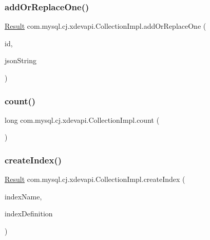 \subsubsection{\texorpdfstring{add\+Or\+Replace\+One()}{addOrReplaceOne()}\hspace{0.1cm}{\footnotesize\ttfamily [2/2]}}
{\footnotesize\ttfamily \mbox{\hyperlink{interfacecom_1_1mysql_1_1cj_1_1xdevapi_1_1_result}{Result}} com.\+mysql.\+cj.\+xdevapi.\+Collection\+Impl.\+add\+Or\+Replace\+One (\begin{DoxyParamCaption}\item[{String}]{id,  }\item[{String}]{json\+String }\end{DoxyParamCaption})}

\mbox{\label{classcom_1_1mysql_1_1cj_1_1xdevapi_1_1_collection_impl_ac5d114d9962c30fe704586addce32f07}} 
\subsubsection{\texorpdfstring{count()}{count()}}
{\footnotesize\ttfamily long com.\+mysql.\+cj.\+xdevapi.\+Collection\+Impl.\+count (\begin{DoxyParamCaption}{ }\end{DoxyParamCaption})}

\mbox{\label{classcom_1_1mysql_1_1cj_1_1xdevapi_1_1_collection_impl_ab56617c315aeee63c89d1b0d6a498b8c}} 
\subsubsection{\texorpdfstring{create\+Index()}{createIndex()}\hspace{0.1cm}{\footnotesize\ttfamily [1/2]}}
{\footnotesize\ttfamily \mbox{\hyperlink{interfacecom_1_1mysql_1_1cj_1_1xdevapi_1_1_result}{Result}} com.\+mysql.\+cj.\+xdevapi.\+Collection\+Impl.\+create\+Index (\begin{DoxyParamCaption}\item[{String}]{index\+Name,  }\item[{\mbox{\hyperlink{interfacecom_1_1mysql_1_1cj_1_1xdevapi_1_1_db_doc}{Db\+Doc}}}]{index\+Definition }\end{DoxyParamCaption})}

